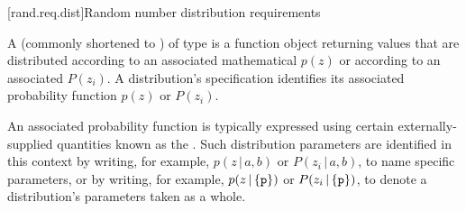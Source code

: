 
[rand.req.dist]{Random number distribution requirements}%
%

\pnum
A 
(commonly shortened to )
 of type 
is a function object
returning values
that are distributed according to
an associated mathematical 
$p(z)$
or according to
an associated 
$P(z_i)$.
A distribution's specification
identifies its associated probability function
$p(z)$ or $P(z_i)$.

\pnum
An associated probability function is typically expressed
using certain externally-supplied quantities
known as the .
Such distribution parameters are identified
in this context by writing, for example,
  $p(z\,|\,a,b)$ or $P(z_i\,|\,a,b)$,
  to name specific parameters,
or by writing, for example,
  $p(z\,|\left\{\texttt{\protect p}\right\})$
  or $P(z_i\,|\left\{\texttt{\protect p}\right\})$,
  to denote a distribution's parameters  taken as a whole.

